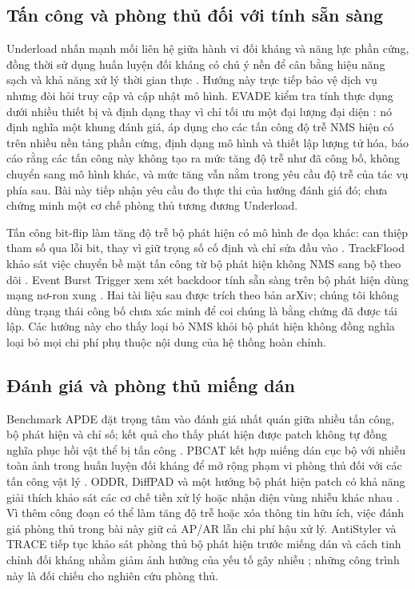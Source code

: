 \documentclass[12pt,a4paper]{article}
\begin{document}
\subsection{Tấn công và phòng thủ đối với tính sẵn sàng}
Underload nhấn mạnh mối liên hệ giữa hành vi đối kháng và năng lực phần cứng, đồng thời sử dụng huấn luyện đối kháng có chú ý nền để cân bằng hiệu năng sạch và khả năng xử lý thời gian thực \cite{underload2025}. Hướng này trực tiếp bảo vệ dịch vụ nhưng đòi hỏi truy cập và cập nhật mô hình. EVADE kiểm tra tính thực dụng dưới nhiều thiết bị và định dạng thay vì chỉ tối ưu một đại lượng đại diện \cite{evade2025}: nó định nghĩa một khung đánh giá, áp dụng cho các tấn công độ trễ NMS hiện có trên nhiều nền tảng phần cứng, định dạng mô hình và thiết lập lượng tử hóa, báo cáo rằng các tấn công này không tạo ra mức tăng độ trễ như đã công bố, không chuyển sang mô hình khác, và mức tăng vẫn nằm trong yêu cầu độ trễ của tác vụ phía sau. Bài này tiếp nhận yêu cầu đo thực thi của hướng đánh giá đó; chưa chứng minh một cơ chế phòng thủ tương đương Underload.

Tấn công bit-flip làm tăng độ trễ bộ phát hiện có mô hình đe dọa khác: can thiệp tham số qua lỗi bit, thay vì giữ trọng số cố định và chỉ sửa đầu vào \cite{bitflip2025}. TrackFlood khảo sát việc chuyển bề mặt tấn công từ bộ phát hiện không NMS sang bộ theo dõi \cite{trackflood2026}. Event Burst Trigger xem xét backdoor tính sẵn sàng trên bộ phát hiện dùng mạng nơ-ron xung \cite{eventburst2026}. Hai tài liệu sau được trích theo bản arXiv; chúng tôi không dùng trạng thái công bố chưa xác minh để coi chúng là bằng chứng đã được tái lập. Các hướng này cho thấy loại bỏ NMS khỏi bộ phát hiện không đồng nghĩa loại bỏ mọi chi phí phụ thuộc nội dung của hệ thống hoàn chỉnh.

\subsection{Đánh giá và phòng thủ miếng dán}
Benchmark APDE đặt trọng tâm vào đánh giá nhất quán giữa nhiều tấn công, bộ phát hiện và chỉ số; kết quả cho thấy phát hiện được patch không tự đồng nghĩa phục hồi vật thể bị tấn công \cite{apde2025}. PBCAT kết hợp miếng dán cục bộ với nhiễu toàn ảnh trong huấn luyện đối kháng để mở rộng phạm vi phòng thủ đối với các tấn công vật lý \cite{pbcat2025}. ODDR, DiffPAD và một hướng bộ phát hiện patch có khả năng giải thích khảo sát các cơ chế tiền xử lý hoặc nhận diện vùng nhiễu khác nhau \cite{oddr2025,diffpad2025,unifiedpatchdet2025}. Vì thêm công đoạn có thể làm tăng độ trễ hoặc xóa thông tin hữu ích, việc đánh giá phòng thủ trong bài này giữ cả AP/AR lẫn chi phí hậu xử lý. AntiStyler và TRACE tiếp tục khảo sát phòng thủ bộ phát hiện trước miếng dán và cách tinh chỉnh đối kháng nhằm giảm ảnh hưởng của yếu tố gây nhiễu \cite{antistyler2026,trace2026}; những công trình này là đối chiếu cho nghiên cứu phòng thủ.
\end{document}
